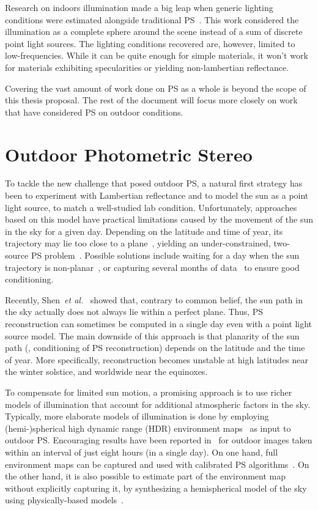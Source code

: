 \documentclass{report}
\begin{document}
Research on indoors illumination made a big leap when generic lighting conditions were estimated alongside traditional PS~\cite{basri-ijcv-2007}. This work considered the illumination as a complete sphere around the scene instead of a sum of discrete point light sources. The lighting conditions recovered are, however, limited to low-frequencies. While it can be quite enough for simple materials, it won't work for materials exhibiting specularities or yielding non-lambertian reflectance.

Covering the vast amount of work done on PS as a whole is beyond the scope of this thesis proposal. The rest of the document will focus more closely on work that have considered PS on outdoor conditions.


\section{Outdoor Photometric Stereo}

To tackle the new challenge that posed outdoor PS, a natural first strategy has been to experiment with Lambertian reflectance and to model the sun as a point light source, to match a well-studied lab condition. Unfortunately, approaches based on this model have practical limitations caused by the movement of the sun in the sky for a given day. Depending on the latitude and time of year, its trajectory may lie too close to a plane~\cite{shen-pg-14}, yielding an under-constrained, two-source PS problem~\cite{hernandez-pami-11}. Possible solutions include waiting for a day when the sun trajectory is non-planar~\cite{shen-pg-14}, or capturing several months of data~\cite{ackermann-cvpr-12,abrams-eccv-12} to ensure good conditioning.

Recently, Shen~{\em et al.}~\cite{shen-pg-14} showed that, contrary to common belief, the sun path in the sky actually does not always lie within a perfect plane. Thus, PS reconstruction can sometimes be computed in a single day even with a point light source model. The main downside of this approach is that planarity of the sun path (\ie, conditioning of PS reconstruction) depends on the latitude and the time of year. More specifically, reconstruction becomes unstable at high latitudes near the winter solstice, and worldwide near the equinoxes.

To compensate for limited sun motion, a promising approach is to use richer models of illumination that account for additional atmospheric factors in the sky. Typically, more elaborate models of illumination is done by employing (hemi-)spherical high dynamic range (HDR) environment maps~\cite{debevec-siggraph-98,reinhard-book-05} as input to outdoor PS. Encouraging results have been reported in~\cite{yu-iccp-13} for outdoor images taken within an interval of just eight hours (in a single day). On one hand, full environment maps can be captured and used with calibrated PS algorithms~\cite{yu-iccp-13,shi-3dv-14,hung-wacv-15}. On the other hand, it is also possible to estimate part of the environment map without explicitly capturing it, by synthesizing a hemispherical model of the sky using physically-based models~\cite{inose-tcva-13,jung-cvpr-15}.
\end{document}
